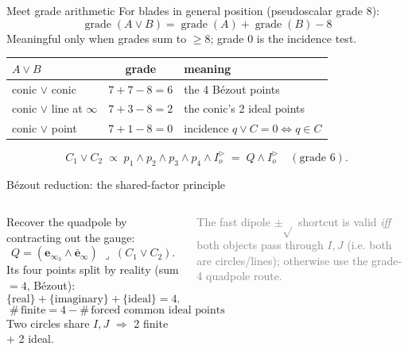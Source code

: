 \documentclass[aspectratio=169, 10pt]{beamer}
\newcommand{\einfb}{\bar{\mathbf{e}}_\infty}
\newcommand{\einfi}[1]{\mathbf{e}_{\infty_{#1}}}
\newcommand{\Iod}{I_o^{\triangleright}}
\newcommand{\wed}{\wedge}
\newcommand{\meet}{\vee}
\begin{document}
\begin{frame}[t]{Meet grade arithmetic}
  For blades in general position (pseudoscalar grade 8):
  \[
    \boxed{\;\operatorname{grade}(A\meet B)=\operatorname{grade}(A)+\operatorname{grade}(B)-8\;}
  \]
  Meaningful only when grades sum to $\ge 8$; grade $0$ is the \alert{incidence test}.
  \vspace{0.2cm}
  \begin{center}
  \renewcommand{\arraystretch}{1.2}
  \small
  \begin{tabular}{l c l}
    $A\meet B$ & grade & meaning\\
    \hline
    conic $\meet$ conic & $7{+}7{-}8=6$ & the 4 B\'ezout points\\
    conic $\meet$ line at $\infty$ & $7{+}3{-}8=2$ & the conic's 2 ideal points\\
    conic $\meet$ point & $7{+}1{-}8=0$ & incidence $q\meet C=0\Leftrightarrow q\in C$\\
  \end{tabular}
  \end{center}
  \vspace{0.2cm}
  \[
    C_1\meet C_2 \;\propto\; p_1\wed p_2\wed p_3\wed p_4\wed\Iod \;=\; Q\wed\Iod
    \quad(\text{grade }6).
  \]
\end{frame}

\begin{frame}[t]{B\'ezout reduction: the shared-factor principle}
  \setlength{\columnsep}{14pt}
  \begin{columns}[T]
      Recover the quadpole by contracting out the gauge:
      \[
        Q = (\einfi3\wed\einfb)\;\lrcorner\;(C_1\meet C_2).
      \]
      Its four points split by reality (sum $=4$, B\'ezout):
      \[
        \{\text{real}\}+\{\text{imaginary}\}+\{\text{ideal}\}=4 .
      \]
      \vspace{0.2cm}
      \[
        \boxed{\;\#\,\text{finite} = 4 - \#\,\text{forced common ideal points}\;}
      \]
      Two circles share $I,J$ $\Rightarrow$ \alert{2 finite} $+$ 2 ideal.
      \vspace{0.15cm}

      \textcolor{gray}{The fast dipole $\pm\sqrt{}$ shortcut is valid \emph{iff} both objects pass through $I,J$ (i.e. both are circles/lines); otherwise use the grade-4 quadpole route.}

      \centering
  \end{columns}
\end{frame}
\end{document}
